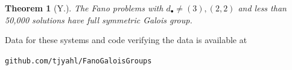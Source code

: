 \documentclass[final]{beamer}
\theoremstyle{thrm}
\newtheorem{thm}{Theorem}
\newcommand{\tallminipage}{\begin{minipage}{.025\textwidth}~\vspace{0pt}~\end{minipage}}
\begin{document}
\begin{frame}
\begin{minipage}[t]{.3\textwidth}
\vspace{.1cm}

\begin{thm}[Y.]
\vspace{.2cm}
\Large The Fano problems with $d_\bullet\ne (3),(2,2)$ and less than 50,000 solutions have full symmetric Galois group.
\vspace{.1cm}
\end{thm}

Data for these systems and code verifying the data is available at 
\vspace{-.25cm}
\begin{center}
\texttt{github.com/tjyahl/FanoGaloisGroups}
\end{center}
\end{minipage}
%
\tallminipage

\end{frame}
\end{document}
